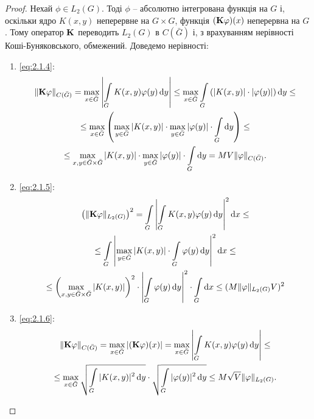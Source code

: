 \begin{proof}
	Нехай $\phi \in L_2(G)$. Тоді $\phi$ -- абсолютно інтегрована функція на $G$ і, оскільки ядро $K(x, y)$ неперервне на $G \times G$, функція $(\bf{K}\phi)(x)$ неперервна на $G$. Тому оператор $\bf{K}$ переводить $L_2(G)$ в $C(\bar G)$ і, з врахуванням нерівності Коші-Буняковського, обмежений. Доведемо нерівності:
	\begin{enumerate}
		\item \eqref{eq:2.1.4}:
		\begin{multline*}
			\| \bf{K} \phi \|_{C(\bar G)} = \Max_{x \in \bar G} \left| \Int_G K(x, y) \phi(y) \diff y \right| \le \Max_{x \in \bar G} \Int_G \left( |K(x, y)| \cdot |\phi(y)| \right) \diff y \le \\
			\le \Max_{x \in \bar G} \left( \Max_{y \in \bar G} |K(x, y)| \cdot \Max_{y \in \bar G} |\phi(y)| \cdot \Int_G \diff y \right) \le \\
			\le \Max_{x, y \in \bar G \times \bar G} |K(x, y)| \cdot \Max_{y \in \bar G} |\phi(y)| \cdot \Int_G \diff y = M V \|\phi\|_{C(\bar G)}.
		\end{multline*}
		\item \eqref{eq:2.1.5}:
		\begin{multline*}
			\left( \| \bf{K} \phi \|_{L_2(G)} \right)^2 = \Int_G \left| \Int_G K(x, y) \phi(y) \diff y \right|^2 \diff x \le \\
			\le \Int_G \left| \Max_{y \in \bar G} |K(x, y)| \cdot \Int_G \phi(y) \diff y \right|^2 \diff x \le \\
			\le \left( \Max_{x, y \in \bar G \times \bar G} |K(x, y)| \right)^2 \cdot \left| \Int_G \phi(y) \diff y \right|^2 \cdot \Int_G \diff x \le (M \| \phi\|_{L_2(G)} V)^2
		\end{multline*}
		\item \eqref{eq:2.1.6}:
		\begin{multline*}
			\| \bf{K} \phi \|_{C(\bar G)} = \Max_{x \in \bar G} |(\bf{K} \phi) (x)| = \Max_{x \in \bar G} \left| \Int_G K(x, y) \phi(y) \diff y \right| \le \\
			\le \Max_{x \in \bar G} \sqrt{\Int_G |K(x, y)|^2 \diff y} \cdot \sqrt{\Int_G |\phi(y)|^2 \diff y} \le M \sqrt{V} \|\phi\|_{L_2(G)}.
		\end{multline*}
	\end{enumerate}
\end{proof}

